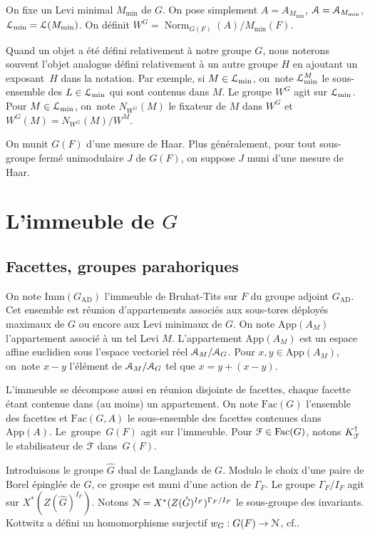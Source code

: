 \documentclass[11pt]{article}
\newcommand{\cf}{cf.\xspace}
\numberwithin{equation}{section}\providecommand{\og}{«\,}\providecommand{\fg}{\,»}
\let\mathcal \EuScript
\let\oldS\S
\renewcommand{\S}{\oldS\,}
\newcommand{\AD}{\mathrm{AD}}
\newcommand{\App}{\mathrm{App}}
\newcommand{\Fac}{\mathrm{Fac}}
\newcommand{\Imm}{\mathrm{Imm}}
\DeclareMathOperator{\Norm}{Norm}
\newcommand{\cA}{\mathcal{A}}
\newcommand{\cF}{\mathcal{F}}
\newcommand{\cL}{\mathcal{L}}
\newcommand{\cN}{\mathcal{N}}
\theoremstyle{plain}
\theoremstyle{definition}
\begin{document}
On fixe un Levi minimal $M_{\min}$ de $G$. On pose simplement $A=A_{M_{\min}}$, $\cA=\cA_{M_{\min}}$, $\cL_{\min}=\cL(M_{\min})$. On définit $W^G=\Norm_{G(F)}(A)/M_{\min}(F)$.

Quand un objet a été défini relativement à notre groupe $G$, nous noterons souvent l'objet analogue défini relativement à un autre groupe $H$ en ajoutant un exposant~$H$ dans la notation. Par exemple, si $M\in \cL_{\min}$, on~note $\cL_{\min}^M$ le sous-ensemble des $L\in \cL_{\min}$ qui sont contenus dans $M$. Le groupe $W^G$ agit sur $\cL_{\min}$.
Pour $M\in \cL_{\min}$, on~note $N_{W^G}(M)$ le fixateur de $M$ dans $W^G$ et $W^G(M)=N_{W^G}(M)/W^M$.

On munit $G(F)$ d'une mesure de Haar. Plus généralement, pour tout sous-groupe fermé unimodulaire $J$ de $G(F)$, on suppose $J$ muni d'une mesure de Haar.

\section{L'immeuble de \texorpdfstring{$G$}{G}}

\subsection{Facettes, groupes parahoriques}\label{facettes}

On note $\Imm(G_{\AD})$ l'immeuble de Bruhat-Tits sur $F$ du groupe adjoint $G_{\AD}$. Cet ensemble est réunion d'appartements associés aux sous-tores déployés maximaux de $G$ ou encore aux Levi minimaux de $G$. On note $\App(A_{M})$ l'appartement associé à un tel Levi $M$. L'appartement $\App(A_{M})$ est un espace affine euclidien sous l'espace vectoriel réel $\cA_{M}/\cA_{G}$. Pour $x,y\in \App(A_{M})$, on~note $x-y$ l'élément de $\cA_{M}/\cA_{G}$ tel que $x=y+(x-y)$.

L'immeuble se décompose aussi en réunion disjointe de facettes, chaque facette étant contenue dans (au moins) un appartement. On note $\Fac(G)$ l'ensemble des facettes et $\Fac(G,A)$ le sous-ensemble des facettes contenues dans $\App(A)$. Le~grou\-pe~$G(F)$ agit sur l'immeuble. Pour $\cF\in \Fac(G)$, notons $K_{\cF}^{\dag}$ le stabilisateur de $\cF$ dans~$G(F)$.

Introduisons le groupe $\hat{G}$ dual de Langlands de $G$. Modulo le choix d'une paire de Borel épinglée de $\hat{G}$, ce groupe est muni d'une action de $\Gamma_{F}$. Le groupe $\Gamma_{F}/I_{F}$ agit sur $X^*(Z(\hat{G})^{I_{F}})$. Notons $\cN=X^{*}(Z(\hat{G})^{I_{F}})^{\Gamma_{F}/I_{F}}$ le sous-groupe des invariants. Kottwitz a défini un homomorphisme surjectif $w_{G}:G(F)\to \cN$, \cf \cite[\S7]{K}.
\end{document}
